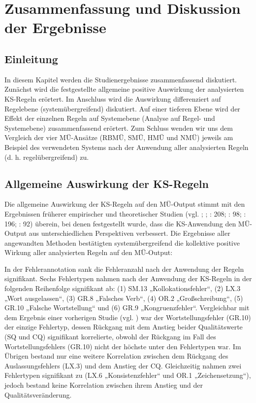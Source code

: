 \chapter{\label{ch:6}Zusammenfassung und Diskussion der Ergebnisse}

\section{\label{sec:6.0}Einleitung}

In diesem Kapitel werden die Studienergebnisse zusammenfassend diskutiert. Zunächst wird die festgestellte allgemeine positive Auswirkung der analysierten KS-Regeln erörtert. Im Anschluss wird die Auswirkung differenziert auf Regelebene (systemübergreifend) diskutiert. Auf einer tieferen Ebene wird der Effekt der einzelnen Regeln auf Systemebene (Analyse auf Regel- und Systemebene) zusammenfassend erörtert. Zum Schluss wenden wir uns dem Vergleich der vier MÜ-Ansätze (RBMÜ, SMÜ, HMÜ und NMÜ) jeweils am Beispiel des verwendeten Systems nach der Anwendung aller analysierten Regeln (d. h. regelübergreifend) zu.

\section{\label{sec:6.1}Allgemeine Auswirkung der KS-Regeln}

Die allgemeine Auswirkung der KS-Regeln auf den MÜ-Output stimmt mit den Ergebnissen früherer empirischer und theoretischer Studien (vgl. \citealt{NybergMitamura1996}; \citealt{Bernth1999}; \citealt{BernthGdaniec2001}: 208; \citealt{Drugan2013}: 98; \citealt{DrewerZiegler2014}: 196; \citealt{Wittkowsky2017}: 92) überein, bei denen festgestellt wurde, dass die KS-Anwendung den MÜ-Output aus unterschiedlichen Perspektiven verbessert. Die Ergebnisse aller angewandten Methoden bestätigten systemübergreifend die kollektive positive Wirkung aller analysierten Regeln auf den MÜ-Output:

In der Fehlerannotation sank die Fehleranzahl nach der Anwendung der Regeln signifikant. Sechs Fehlertypen nahmen nach der Anwendung der KS-Regeln in der folgenden Reihenfolge signifikant ab: (1) SM.13 „Kollokationsfehler“, (2) LX.3 „Wort ausgelassen“, (3) GR.8 „Falsches Verb“, (4) OR.2 „Großschreibung“, (5) GR.10 „Falsche Wortstellung“ und (6) GR.9 „Kongruenzfehler“. Vergleichbar mit dem Ergebnis einer vorherigen Studie (vgl. \citealt{KirchhoffEtAl2014}) war der Wortstellungsfehler (GR.10) der einzige Fehlertyp, dessen Rückgang mit dem Anstieg beider Qualitätswerte (SQ und CQ) signifikant korrelierte, obwohl der Rückgang im Fall des Wortstellungsfehlers (GR.10) nicht der höchste unter den Fehlertypen war. Im Übrigen bestand nur eine weitere Korrelation zwischen dem Rückgang des Auslassungsfehlers (LX.3) und dem Anstieg der CQ. Gleichzeitig nahmen zwei Fehlertypen signifikant zu (LX.6 „Konsistenzfehler“ und OR.1 „Zeichensetzung“), jedoch bestand keine Korrelation zwischen ihrem Anstieg und der Qualitätsveränderung.

